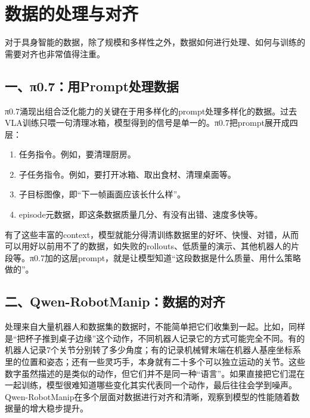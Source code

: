 \setcounter{section}{3}

\hypertarget{ux6570ux636eux7684ux5904ux7406ux4e0eux5bf9ux9f50}{%
\section{数据的处理与对齐}\label{ux6570ux636eux7684ux5904ux7406ux4e0eux5bf9ux9f50}}

对于具身智能的数据，除了规模和多样性之外，数据如何进行处理、如何与训练的需要对齐也非常值得注重。

\hypertarget{ux4e00ux3c00.7ux7528promptux5904ux7406ux6570ux636e}{%
\subsection{一、π0.7：用Prompt处理数据}\label{ux4e00ux3c00.7ux7528promptux5904ux7406ux6570ux636e}}

π0.7涌现出组合泛化能力的关键在于用多样化的prompt处理多样化的数据。过去VLA训练只喂一句清理冰箱，模型得到的信号是单一的。π0.7把prompt展开成四层：

\begin{enumerate}
\def\labelenumi{\arabic{enumi}.}
\item
  任务指令。例如，要清理厨房。
\item
  子任务指令。例如，要打开冰箱、取出食材、清理桌面等。
\item
  子目标图像，即``下一帧画面应该长什么样''。
\item
  episode元数据，即这条数据质量几分、有没有出错、速度多快等。
\end{enumerate}

有了这些丰富的context，模型就能分得清训练数据里的好坏、快慢、对错，从而可以用好以前用不了的数据，如失败的rollouts、低质量的演示、其他机器人的片段等。π0.7加的这层prompt，就是让模型知道``这段数据是什么质量、用什么策略做的''。

\hypertarget{ux4e8cqwen-robotmanipux6570ux636eux7684ux5bf9ux9f50}{%
\subsection{二、Qwen-RobotManip：数据的对齐}\label{ux4e8cqwen-robotmanipux6570ux636eux7684ux5bf9ux9f50}}

处理来自大量机器人和数据集的数据时，不能简单把它们收集到一起。比如，同样是``把杯子推到桌子边缘''这个动作，不同机器人记录它的方式可能完全不同。有的机器人记录7个关节分别转了多少角度；有的记录机械臂末端在机器人基座坐标系里的位置和姿态；还有一些灵巧手，本身就有二十多个可以独立运动的关节。这些数字虽然描述的是类似的动作，但它们并不是同一种``语言''。如果直接把它们混在一起训练，模型很难知道哪些变化其实代表同一个动作，最后往往会学到噪声。Qwen-RobotManip在多个层面对数据进行对齐和清晰，观察到模型的性能随着数据量的增大稳步提升。

